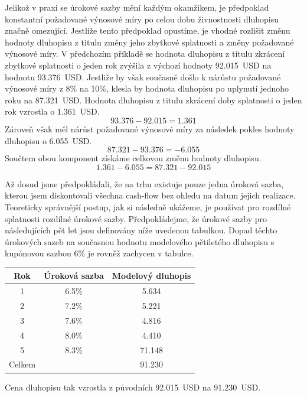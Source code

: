 \documentclass[a4paper]{book}
\begin{document}
Jelikož v praxi se úrokové sazby mění každým okamžikem, je předpoklad konstantní požadované výnosové míry po celou dobu živnostnosti dluhopisu značně omezující. Jestliže tento předpoklad opustíme, je vhodné rozlišit změnu hodnoty dluhopisu z titulu změny jeho zbytkové splatnosti a změny požadované výnosové míry. V předchozím příkladě se hodnota dluhopisu z titulu zkrácení zbytkové splatnosti o jeden rok zvýšila z výchozí hodnoty 92.015~USD na hodnotu 93.376~USD. Jestliže by však současně došlo k nárůstu požadované výnosové míry z 8\% na 10\%, klesla by hodnota dluhopisu po uplynutí jednoho roku na 87.321~USD. Hodnota dluhopisu z titulu zkrácení doby splatnosti o jeden rok vzrostla o 1.361~USD.
\begin{equation*}
93.376 - 92.015 = 1.361
\end{equation*}
Zároveň však měl nárůst požadované výnosové míry za následek pokles hodnoty dluhopisu o 6.055~USD.
\begin{equation*}
87.321 - 93.376 = -6.055
\end{equation*}
Součtem obou komponent získáme celkovou změnu hodnoty dluhopisu.
\begin{equation*}
1.361 - 6.055 = 87.321 - 92.015
\end{equation*}

Až dosud jsme předpokládali, že na trhu existuje pouze jedna úroková sazba, kterou jsem diskontovali všechna cash-flow bez ohledu na datum jejich realizace. Teoreticky správnější postup, jak si následně ukážeme, je používat pro rozdílné splatnosti rozdílné úrokové sazby. Předpokládejme, že úrokové sazby pro následujících pět let jsou definovány níže uvedenou tabulkou. Dopad těchto úrokových sazeb na současnou hodnotu modelového pětiletého dluhopisu s kupónovou sazbou 6\% je rovněž zachycen v tabulce.
\begin{center}
\begin{tabular}{c c c}
\textbf{Rok} & \textbf{Úroková sazba} & \textbf{Modelový dluhopis} \\
\hline
1      & 6.5\% &  5.634 \\
2      & 7.2\% &  5.221 \\
3      & 7.6\% &  4.816 \\
4      & 8.0\% &  4.410 \\
5      & 8.3\% & 71.148 \\
Celkem &       & 91.230
\end{tabular}
\end{center}
Cena dluhopisu tak vzrostla z původních 92.015~USD na 91.230~USD.
\end{document}
